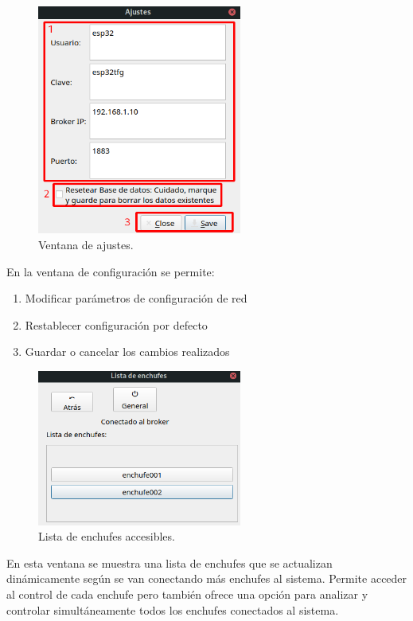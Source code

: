 \documentclass[a4paper,10pt]{article}
\begin{document}
\begin{figure}[H]
  \centering
  \includegraphics[width=0.6\textwidth]{img/interfaz_settings_window.png}
  \caption{Ventana de ajustes.}\label{fig:interfaz-settings}
\end{figure}

En la ventana de configuración se permite:

\begin{enumerate}
\item{Modificar parámetros de configuración de red}
\item{Restablecer configuración por defecto}
\item{Guardar o cancelar los cambios realizados}
\end{enumerate}

\begin{figure}[H]
  \centering
  \includegraphics[width=0.6\textwidth]{img/interfaz_plug_list.png}
  \caption{Lista de enchufes accesibles.}\label{fig:interfaz-plug-list}
\end{figure}

En esta ventana se muestra una lista de enchufes que se actualizan
dinámicamente según se van conectando más enchufes al sistema. Permite
acceder al control de cada enchufe pero también ofrece una opción para
analizar y controlar simultáneamente todos los enchufes conectados al
sistema.
\end{document}
